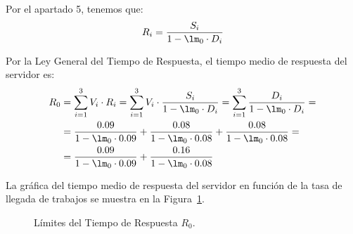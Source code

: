 \begin{ejercicio}
\begin{enumerate}
        Por el apartado 5, tenemos que:
        \begin{equation*}
            R_i = \dfrac{S_i}{1 - \lm_0 \cdot D_i}
        \end{equation*}

        Por la Ley General del Tiempo de Respuesta, el tiempo medio de respuesta del servidor es:
        \begin{align*}
            R_0 &= \sum_{i=1}^{3} V_i \cdot R_i = \sum_{i=1}^{3} V_i \cdot \dfrac{S_i}{1 - \lm_0 \cdot D_i}
            = \sum_{i=1}^{3} \dfrac{D_i}{1 - \lm_0 \cdot D_i}
            =\\&= \dfrac{0.09}{1 - \lm_0 \cdot 0.09} + \dfrac{0.08}{1 - \lm_0 \cdot 0.08} + \dfrac{0.08}{1 - \lm_0 \cdot 0.08}
            =\\&= \dfrac{0.09}{1-\lm_0 \cdot 0.09} + \dfrac{0.16}{1 - \lm_0 \cdot 0.08}
        \end{align*}

        La gráfica del tiempo medio de respuesta del servidor en función de la tasa de llegada de trabajos se muestra en la Figura~\ref{fig:5.22}.
        \begin{figure}[h]
            \centering
            \caption{Límites del Tiempo de Respuesta $R_0$.}
            \label{fig:5.22}
        \end{figure}
    \end{enumerate}
\end{ejercicio}
